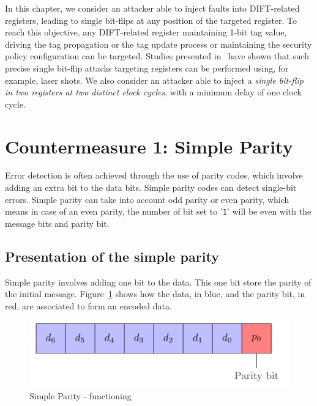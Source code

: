 In this chapter, we consider an attacker able to inject faults into DIFT-related registers, leading to single bit-flips at any position of the targeted register. To reach this objective, any DIFT-related register maintaining 1-bit tag value, driving the tag propagation or the tag update process or maintaining the security policy configuration can be targeted. Studies presented in~\cite{ZDCRT-12-dcis,CLFT-14-cosade} have shown that such precise single bit-flip attacks targeting registers can be performed using, for example, laser shots. We also consider an attacker able to inject a \textit{single bit-flip in two registers at two distinct clock cycles}, with a minimum delay of one clock cycle.

\section{Countermeasure 1: Simple Parity}
\label{chapter:simpleparity}

Error detection is often achieved through the use of parity codes, which involve adding an extra bit to the data bits. Simple parity codes can detect single-bit errors. Simple parity can take into account odd parity or even parity, which means in case of an even parity, the number of bit set to '\texttt{1}' will be even with the message bits and parity bit.

\subsection{Presentation of the simple parity}
Simple parity involves adding one bit to the data. This one bit store the parity of the initial message. Figure~\ref{fig:simpleparity_functionning} shows how the data, in blue, and the parity bit, in red, are associated to form an encoded data.

\begin{figure}[ht]
    \centering
    \includegraphics[page=1]{c5_countermeasures_dift/img/simple_parity.pdf}
    \caption{Simple Parity - functioning}
    \label{fig:simpleparity_functionning}
\end{figure}

